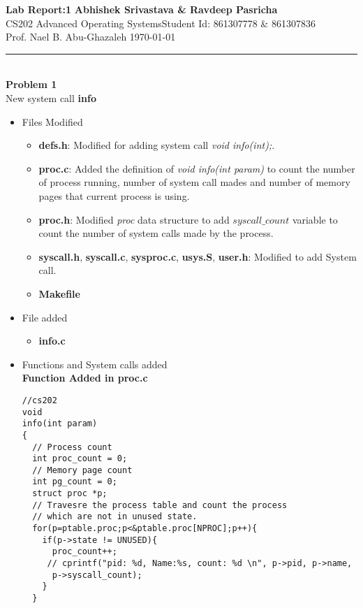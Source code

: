 \documentclass[a4paper, 10pt]{article}
\begin{document}
\noindent
\large\textbf{Lab Report:1} \hfill \textbf{Abhishek Srivastava \& Ravdeep Pasricha} \\
\normalsize CS202 Advanced Operating Systems\hfill Student Id: 861307778 \& 861307836 \\
Prof. Nael B. Abu-Ghazaleh \hfill \today \\
\hrule

\noindent
\\
\large\textbf{Problem 1}\\
New system call \textbf{info}\\
\begin{itemize}
\item Files Modified
\begin{itemize}
\item \textbf{defs.h}: Modified for adding system call  \emph{void info(int);}.
	\item \textbf{proc.c}:  Added the definition of \emph{void
	info(int param)} to count the number of process running, number of system call mades and number of memory pages that current process is using.
	\item \textbf{proc.h}: Modified \emph{proc} data structure to add $syscall\_count$ variable to count the number of system calls made by the process.
	\item \textbf{syscall.h}, \textbf{syscall.c}, \textbf{sysproc.c}, \textbf{usys.S}, \textbf{user.h}: Modified to add System call.
	\item \textbf{Makefile}
\end{itemize}
\item File added 
\begin{itemize}
\item \textbf{info.c}
\end{itemize}
\item Functions and System calls added\\
\textbf{Function Added in proc.c}


\begin{lstlisting}
//cs202
void
info(int param)
{ 
  // Process count
  int proc_count = 0;
  // Memory page count
  int pg_count = 0;
  struct proc *p;
  // Travesre the process table and count the process 
  // which are not in unused state.
  for(p=ptable.proc;p<&ptable.proc[NPROC];p++){
    if(p->state != UNUSED){
      proc_count++;
     // cprintf("pid: %d, Name:%s, count: %d \n", p->pid, p->name,
      p->syscall_count);
    }
  }


\end{lstlisting}
\end{itemize}
\end{document}
